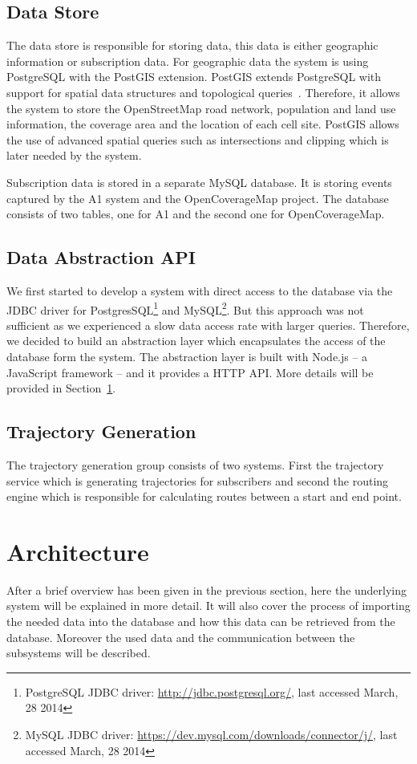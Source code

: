 \subsection{Data Store}
The data store is responsible for storing data, this data is either geographic information or subscription data. For geographic data the system is using PostgreSQL with the PostGIS extension. PostGIS extends PostgreSQL with support for spatial data structures and topological queries~\cite{Obe2011}. Therefore, it allows the system to store the OpenStreetMap road network, population and land use information, the coverage area and the location of each cell site. PostGIS allows the use of advanced spatial queries such as intersections and clipping which is later needed by the system.

Subscription data is stored in a separate MySQL database. It is storing events captured by the A1 system and the OpenCoverageMap project. The database consists of two tables, one for A1 and the second one for OpenCoverageMap.
\subsection{Data Abstraction API}
We first started to develop a system with direct access to the database via the JDBC driver for PostgresSQL\footnote{PostgreSQL JDBC driver: \url{http://jdbc.postgresql.org/}, last accessed March, 28 2014} and MySQL\footnote{MySQL JDBC driver: \url{https://dev.mysql.com/downloads/connector/j/}, last accessed March, 28 2014}. But this approach was not sufficient as we experienced a slow data access rate with larger queries. Therefore, we decided to build an abstraction layer which encapsulates the access of the database form the system. The abstraction layer is built with Node.js -- a JavaScript framework -- and it provides a HTTP API. More details will be provided in Section~\ref{sec:architecture}.
\subsection{Trajectory Generation}
The trajectory generation group consists of two systems. First the trajectory service which is generating trajectories for subscribers and second the routing engine which is responsible for calculating routes between a start and end point.
\section{Architecture}
\label{sec:architecture}
After a brief overview has been given in the previous section, here the underlying system will be explained in more detail. It will also cover the process of importing the needed data into the database and how this data can be retrieved from the database. Moreover the used data and the communication between the subsystems will be described.
